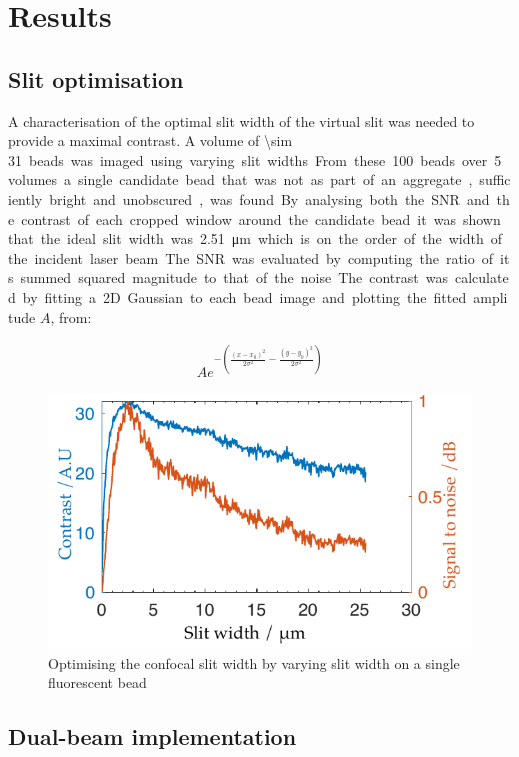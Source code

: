 \section{Results}
\subsection{Slit optimisation}
A characterisation of the optimal slit width of the virtual slit was needed to provide a maximal contrast.
A volume of \SI{\sim 31} beads was imaged using varying slit widths.
From these 100 beads over 5 volumes a single candidate bead that was not as part of an aggregate, sufficiently bright and unobscured, was found.
By analysing both the SNR and the contrast of each cropped window around the candidate bead it was shown that the ideal slit width was \SI{2.51}{\micro\metre} which is on the order of the width of the incident laser beam.
The SNR was evaluated by computing the ratio of its summed squared magnitude to that of the noise.
The contrast was calculated by fitting a 2D Gaussian to each bead image and plotting the fitted amplitude $A$, from:

\begin{align}
  A e^{-\left(\frac{(x-x_0)^2}{2\sigma^2}-\frac{(y-y_0)^2}{2\sigma^2}\right)}
\end{align}

\begin{figure}
  \centering
  \includegraphics{Chapters/dualslit/Figs/PDF/optimal_slit_snr_contrast}
  \caption{Optimising the confocal slit width by varying slit width on a single fluorescent bead}
  \label{fig:optimal_slit_snr_contrast}
\end{figure}

\subsection{Dual-beam implementation}

